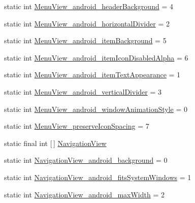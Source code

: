 \begin{DoxyCompactItemize}
\item 
static int \hyperlink{classandroid_1_1support_1_1v7_1_1mediarouter_1_1R_1_1styleable_a2de4fb6def01d6c4b2d7cc86e961a58d}{Menu\+View\+\_\+android\+\_\+header\+Background} = 4
\item 
static int \hyperlink{classandroid_1_1support_1_1v7_1_1mediarouter_1_1R_1_1styleable_a0dfdc070e508eda10bc6aec3af09d0b9}{Menu\+View\+\_\+android\+\_\+horizontal\+Divider} = 2
\item 
static int \hyperlink{classandroid_1_1support_1_1v7_1_1mediarouter_1_1R_1_1styleable_a12e27d06c79c07df1c4f4294540a5dd6}{Menu\+View\+\_\+android\+\_\+item\+Background} = 5
\item 
static int \hyperlink{classandroid_1_1support_1_1v7_1_1mediarouter_1_1R_1_1styleable_a2db0c55a5ea64d6e4e520e5461ab2486}{Menu\+View\+\_\+android\+\_\+item\+Icon\+Disabled\+Alpha} = 6
\item 
static int \hyperlink{classandroid_1_1support_1_1v7_1_1mediarouter_1_1R_1_1styleable_a20e8a09f6069c46231defb4f911cb006}{Menu\+View\+\_\+android\+\_\+item\+Text\+Appearance} = 1
\item 
static int \hyperlink{classandroid_1_1support_1_1v7_1_1mediarouter_1_1R_1_1styleable_a547babce2fcf74d1db985fc93e6781e5}{Menu\+View\+\_\+android\+\_\+vertical\+Divider} = 3
\item 
static int \hyperlink{classandroid_1_1support_1_1v7_1_1mediarouter_1_1R_1_1styleable_ac9fd0f82d65057d958023557551b7306}{Menu\+View\+\_\+android\+\_\+window\+Animation\+Style} = 0
\item 
static int \hyperlink{classandroid_1_1support_1_1v7_1_1mediarouter_1_1R_1_1styleable_ae65c88e6a427903c40bab472037f77a2}{Menu\+View\+\_\+preserve\+Icon\+Spacing} = 7
\item 
static final int \mbox{[}$\,$\mbox{]} \hyperlink{classandroid_1_1support_1_1v7_1_1mediarouter_1_1R_1_1styleable_a9216c77e145f14d4fdd264c2381fce44}{Navigation\+View}
\item 
static int \hyperlink{classandroid_1_1support_1_1v7_1_1mediarouter_1_1R_1_1styleable_a377c12b1e75fabeed8b4da7b123dca1b}{Navigation\+View\+\_\+android\+\_\+background} = 0
\item 
static int \hyperlink{classandroid_1_1support_1_1v7_1_1mediarouter_1_1R_1_1styleable_a345af5a862cf8b50fd6a909bde02ea92}{Navigation\+View\+\_\+android\+\_\+fits\+System\+Windows} = 1
\item 
static int \hyperlink{classandroid_1_1support_1_1v7_1_1mediarouter_1_1R_1_1styleable_a58c9f837fbc6a2fbcbfdbd7a8a1c117e}{Navigation\+View\+\_\+android\+\_\+max\+Width} = 2

\end{DoxyCompactItemize}
